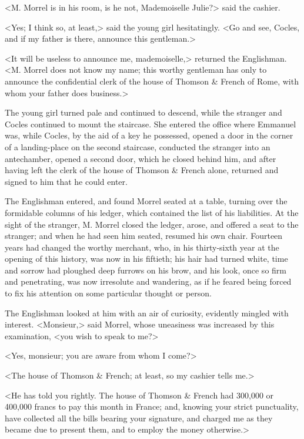  <M. Morrel is in his room, is he not, Mademoiselle Julie?> said the cashier. 

 <Yes; I think so, at least,> said the young girl hesitatingly. <Go and see, Cocles, and if my father is there, announce this gentleman.> 

 <It will be useless to announce me, mademoiselle,> returned the Englishman. <M. Morrel does not know my name; this worthy gentleman has only to announce the confidential clerk of the house of Thomson \& French of Rome, with whom your father does business.> 

 The young girl turned pale and continued to descend, while the stranger and Cocles continued to mount the staircase. She entered the office where Emmanuel was, while Cocles, by the aid of a key he possessed, opened a door in the corner of a landing-place on the second staircase, conducted the stranger into an antechamber, opened a second door, which he closed behind him, and after having left the clerk of the house of Thomson \& French alone, returned and signed to him that he could enter. 

 The Englishman entered, and found Morrel seated at a table, turning over the formidable columns of his ledger, which contained the list of his liabilities. At the sight of the stranger, M. Morrel closed the ledger, arose, and offered a seat to the stranger; and when he had seen him seated, resumed his own chair. Fourteen years had changed the worthy merchant, who, in his thirty-sixth year at the opening of this history, was now in his fiftieth; his hair had turned white, time and sorrow had ploughed deep furrows on his brow, and his look, once so firm and penetrating, was now irresolute and wandering, as if he feared being forced to fix his attention on some particular thought or person. 

 The Englishman looked at him with an air of curiosity, evidently mingled with interest. <Monsieur,> said Morrel, whose uneasiness was increased by this examination, <you wish to speak to me?> 

 <Yes, monsieur; you are aware from whom I come?> 

 <The house of Thomson \& French; at least, so my cashier tells me.> 

 <He has told you rightly. The house of Thomson \& French had 300,000 or 400,000 francs to pay this month in France; and, knowing your strict punctuality, have collected all the bills bearing your signature, and charged me as they became due to present them, and to employ the money otherwise.> 

